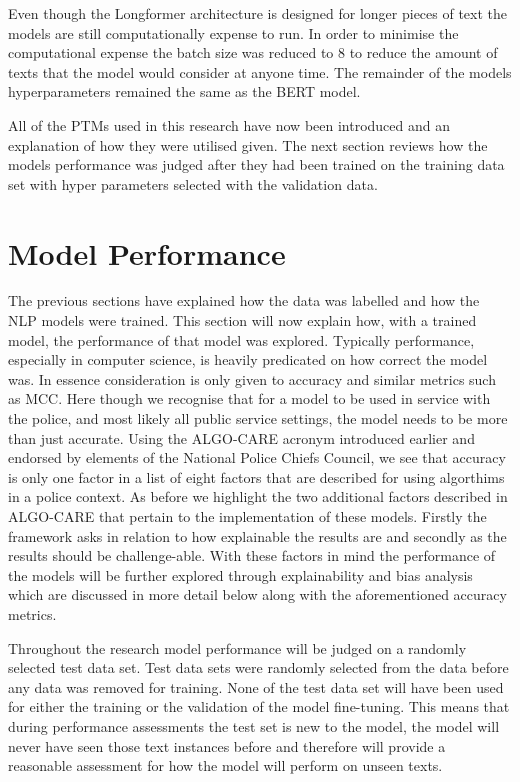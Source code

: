 Even though the Longformer architecture is designed for longer pieces of text the models are still computationally expense to run. In order to minimise the computational expense the batch size was reduced to 8 to reduce the amount of texts that the model would consider at anyone time. The remainder of the models hyperparameters remained the same as the BERT model.

All of the PTMs used in this research have now been introduced and an explanation of how they were utilised given. The next section reviews how the models performance was judged after they had been trained on the training data set with hyper parameters selected with the validation data.


\section{Model Performance} The previous sections have explained how the data was labelled and how the NLP models were trained. This section will now explain how, with a trained model, the performance of that model was explored. Typically performance, especially in computer science, is heavily predicated on how correct the model was. In essence consideration is only given to accuracy and similar metrics such as MCC. Here though we recognise that for a model to be used in service with the police, and most likely all public service settings, the model needs to be more than just accurate. Using the ALGO-CARE acronym introduced earlier and endorsed by elements of the National Police Chiefs Council, we see that accuracy is only one factor in a list of eight factors that are described for using algorthims in a police context. As before we highlight  the two additional factors described in ALGO-CARE that pertain to the implementation of these models. Firstly the framework asks  in relation to how explainable the results are and secondly   as the results should be challenge-able. With these factors in mind the performance of the models will be further explored through explainability and bias analysis which are discussed in more detail below along with the aforementioned accuracy metrics.

Throughout the research model performance will be judged on a randomly selected test data set. Test data sets were randomly selected from the data before any data was removed for training. None of the test data set will have been used for either the training or the validation of the model fine-tuning. This means that during performance assessments the test set is new to the model, the model will never have seen those text instances before and therefore will provide a reasonable assessment for how the model will perform on unseen texts. 


